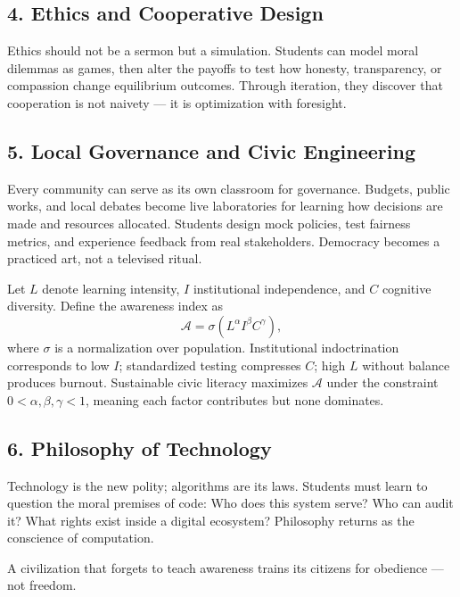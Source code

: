 \documentclass[12pt,twoside]{book}
\begin{document}
\subsection*{4. Ethics and Cooperative Design}
Ethics should not be a sermon but a simulation.  
Students can model moral dilemmas as games, then alter the payoffs to test how honesty, transparency, or compassion change equilibrium outcomes.  
Through iteration, they discover that cooperation is not naivety — it is optimization with foresight.

\subsection*{5. Local Governance and Civic Engineering}
Every community can serve as its own classroom for governance.  
Budgets, public works, and local debates become live laboratories for learning how decisions are made and resources allocated.  
Students design mock policies, test fairness metrics, and experience feedback from real stakeholders.  
Democracy becomes a practiced art, not a televised ritual.

\begin{tcolorbox}[colback=gray!5,colframe=gray!60,boxrule=0.4pt,arc=1mm,
title={Mathematical Interlude: Awareness as a System Variable},
enhanced,breakable,left=5pt,right=5pt]
\small
Let $L$ denote learning intensity, $I$ institutional independence, and $C$ cognitive diversity.  
Define the awareness index as
\[
\mathcal{A} = \sigma(L^\alpha I^\beta C^\gamma),
\]
where $\sigma$ is a normalization over population.  
Institutional indoctrination corresponds to low $I$; standardized testing compresses $C$; high $L$ without balance produces burnout.  
Sustainable civic literacy maximizes $\mathcal{A}$ under the constraint $0<\alpha,\beta,\gamma<1$, meaning each factor contributes but none dominates.
\end{tcolorbox}

\subsection*{6. Philosophy of Technology}
Technology is the new polity; algorithms are its laws.  
Students must learn to question the moral premises of code:  
Who does this system serve?  
Who can audit it?  
What rights exist inside a digital ecosystem?  
Philosophy returns as the conscience of computation.\\

\begin{keyidea}
A civilization that forgets to teach awareness trains its citizens for obedience — not freedom.
\end{keyidea}
\end{document}
